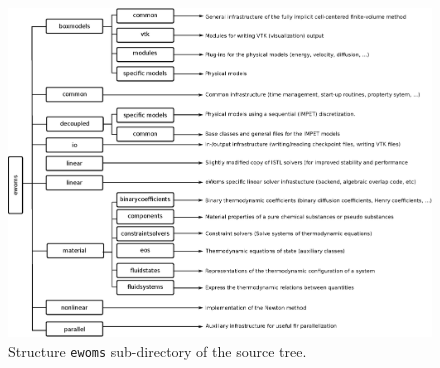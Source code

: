 \begin{landscape}
\begin{figure}[hbt]
  \centering 
  \includegraphics[width=\linewidth, keepaspectratio]{EPS/ewoms_structure.eps}
  \caption{
    \label{fig:ewoms-structure}
    Structure \texttt{ewoms} sub-directory of the \eWoms source tree.
  }
\end{figure}
\end{landscape}


